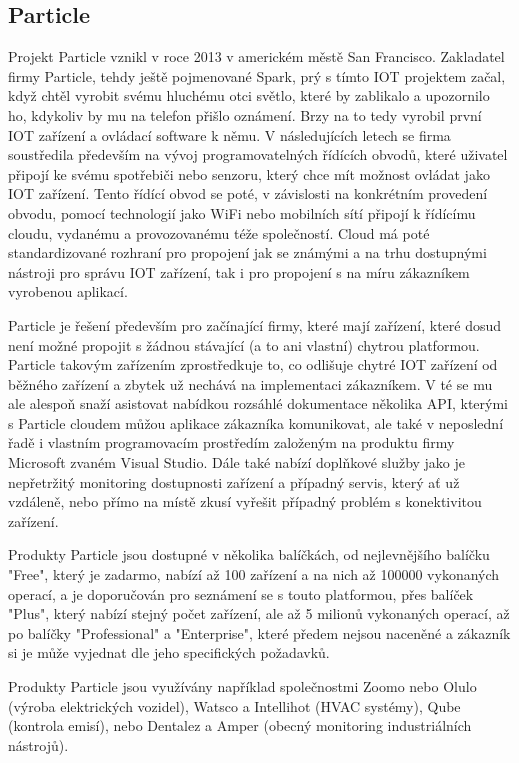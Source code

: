 \subsection{Particle}

Projekt Particle vznikl v roce 2013 v americkém městě San Francisco. Zakladatel firmy Particle, tehdy ještě pojmenované Spark, prý s tímto IOT projektem začal, když chtěl vyrobit svému hluchému otci světlo, které by zablikalo a upozornilo ho, kdykoliv by mu na telefon přišlo oznámení. Brzy na to tedy vyrobil první IOT zařízení a ovládací software k němu. V následujících letech se firma soustředila především na vývoj programovatelných řídících obvodů, které uživatel připojí ke svému spotřebiči nebo senzoru, který chce mít možnost ovládat jako IOT zařízení. Tento řídící obvod se poté, v závislosti na konkrétním provedení obvodu, pomocí technologií jako WiFi nebo mobilních sítí připojí k řídícímu cloudu, vydanému a provozovanému téže společností. Cloud má poté standardizované rozhraní pro propojení jak se známými a na trhu dostupnými nástroji pro správu IOT zařízení, tak i pro propojení s na míru zákazníkem vyrobenou aplikací. 

Particle je řešení především pro začínající firmy, které mají zařízení, které dosud není možné propojit s žádnou stávající (a to ani vlastní) chytrou platformou. Particle takovým zařízením zprostředkuje to, co odlišuje chytré IOT zařízení od běžného zařízení a zbytek už nechává na implementaci zákazníkem. V té se mu ale alespoň snaží asistovat nabídkou rozsáhlé dokumentace několika API, kterými s Particle cloudem můžou aplikace zákazníka komunikovat, ale také v neposlední řadě i vlastním programovacím prostředím založeným na produktu firmy Microsoft zvaném Visual Studio. Dále také nabízí doplňkové služby jako je nepřetržitý monitoring dostupnosti zařízení a případný servis, který ať už vzdáleně, nebo přímo na místě zkusí vyřešit případný problém s konektivitou zařízení.

Produkty Particle jsou dostupné v několika balíčkách, od nejlevnějšího balíčku "Free", který je zadarmo, nabízí až 100 zařízení a na nich až 100000 vykonaných operací, a je doporučován pro seznámení se s touto platformou, přes balíček "Plus", který nabízí stejný počet zařízení, ale až 5 milionů vykonaných operací, až po balíčky "Professional" a "Enterprise", které předem nejsou naceněné a zákazník si je může vyjednat dle jeho specifických požadavků.  

Produkty Particle jsou využívány například společnostmi Zoomo nebo Olulo (výroba elektrických vozidel), Watsco a Intellihot (HVAC systémy), Qube (kontrola emisí), nebo Dentalez a Amper (obecný monitoring industriálních nástrojů).

